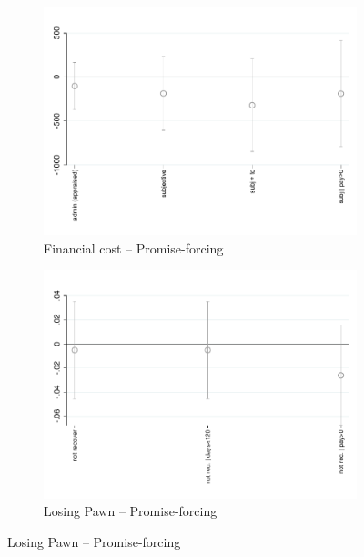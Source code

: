 \documentclass[oneside,11pt]{article}
\begin{document}
\begin{figure}[H]
\begin{center}
    \bigskip
    \bigskip
    
        \begin{subfigure}{0.45\textwidth}
        \caption{Financial cost -- Promise-forcing}
        \centering
        \includegraphics[width=\textwidth]{Figuras/fc_te_pro_3.pdf}
    \end{subfigure}
    \begin{subfigure}{0.45\textwidth}
        \caption{Losing Pawn -- Promise-forcing}
        \centering
        \includegraphics[width=\textwidth]{Figuras/def_te_pro_3.pdf}
    \end{subfigure}
    

    
    

\end{center}
\end{figure}
\end{document}
